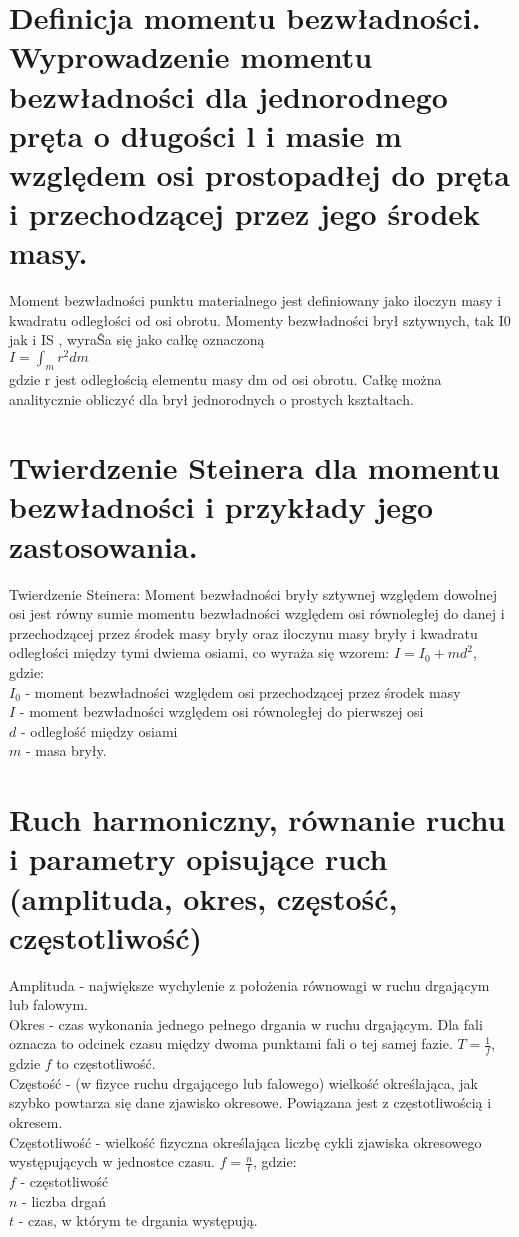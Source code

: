 \documentclass[a4paper,11pt]{article} %
\begin{document}
\section{Definicja momentu bezwładności. Wyprowadzenie momentu bezwładności
dla jednorodnego pręta o długości l i masie m względem osi prostopadłej
do pręta i przechodzącej przez jego środek masy.}

Moment bezwładności punktu materialnego jest definiowany
jako iloczyn masy i kwadratu odległości od osi obrotu. Momenty bezwładności brył
sztywnych, tak I0 jak i IS , wyraŜa się jako całkę oznaczoną\\
$I = \int_m r^2 dm$\\
gdzie r jest odległością elementu masy dm od osi obrotu. Całkę można analitycznie
obliczyć dla brył jednorodnych o prostych kształtach.
\\
{\color{red}{Wyprowadzić moment bezwładności}}

\section{Twierdzenie Steinera dla momentu bezwładności i przykłady jego
zastosowania.}
Twierdzenie Steinera: Moment bezwładności bryły sztywnej względem dowolnej osi jest równy sumie momentu bezwładności względem osi równoległej do danej i przechodzącej przez środek masy bryły oraz iloczynu masy bryły i kwadratu odległości między tymi dwiema osiami, co wyraża się wzorem: $I = I_0 + md^2$, gdzie: \\
$I_0$ - moment bezwładności względem osi przechodzącej przez środek masy\\
$I$ - moment bezwładności względem osi równoległej do pierwszej osi\\
$d$ - odległość między osiami\\
$m$ - masa bryły.\\
{\color{red}{Dodać przykład}}


\section{ Ruch harmoniczny, równanie ruchu i parametry opisujące ruch (amplituda,
okres, częstość, częstotliwość)}
Amplituda - największe wychylenie z położenia równowagi w ruchu drgającym lub falowym. \\
Okres - czas wykonania jednego pełnego drgania w ruchu drgającym. Dla fali oznacza to odcinek czasu między dwoma punktami fali o tej samej fazie. $ T = \frac{1}{f}$, gdzie $f$ to częstotliwość.\\
Częstość - (w fizyce ruchu drgającego lub falowego) wielkość określająca, jak szybko powtarza się dane zjawisko okresowe. Powiązana jest z częstotliwością i okresem.\\
Częstotliwość - wielkość fizyczna określająca liczbę cykli zjawiska okresowego występujących w jednostce czasu. $f = \frac{n}{t}$, gdzie: \\
$f$ - częstotliwość\\
$n$ - liczba drgań\\
$t$ - czas, w którym te drgania występują.\\
\end{document}
